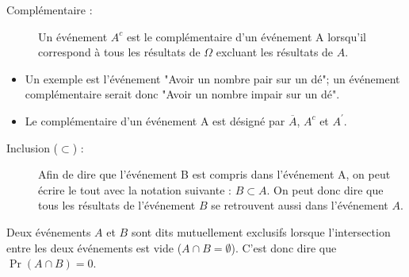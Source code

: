 \documentclass[10pt, french]{article}
\def\firstrectangle{(0,0) rectangle (7, 4)}
\def\firstcircle{(2.5,2) circle (1.5cm)}
\def\secondcircle{(4.5, 2) circle (1.5cm)}
\begin{document}
\begin{multicols*}{2}
\begin{center}
\end{center}
\begin{description} 
 \item[Complémentaire :] Un événement $A^{c}$ est le complémentaire d'un événement A lorsqu'il correspond à tous les résultats de $\Omega$ excluant les résultats de $A$. 
\end{description}
\begin{itemize}
  	\item	Un exemple est l'événement "Avoir un nombre pair sur un dé"; un événement complémentaire serait donc "Avoir un nombre impair sur un dé".
  	\item   Le complémentaire d'un événement A est désigné par {$\overline{A}$}, $A^{c}$ et $A^{'}$.
\end{itemize}
\begin{center}
\end{center}
\pagebreak
\begin{description} 
 \item[Inclusion ($\subset$) :] Afin de dire que l'événement B est compris dans l'événement A, on peut écrire le tout avec la notation suivante : $B \subset A$. On peut donc dire que tous les résultats de l'événement $B$ se retrouvent aussi dans l'événement $A$.
\end{description}
\begin{center}
\end{center}

\begin{definitionNOHFILL}
Deux événements $A$ et $B$ sont dits mutuellement exclusifs lorsque l'intersection entre les deux événements est vide ($A \cap B = \emptyset$). C'est donc dire que $\Pr(A \cap B) = 0$.
\end{definitionNOHFILL}


\end{multicols*}
\end{document}
